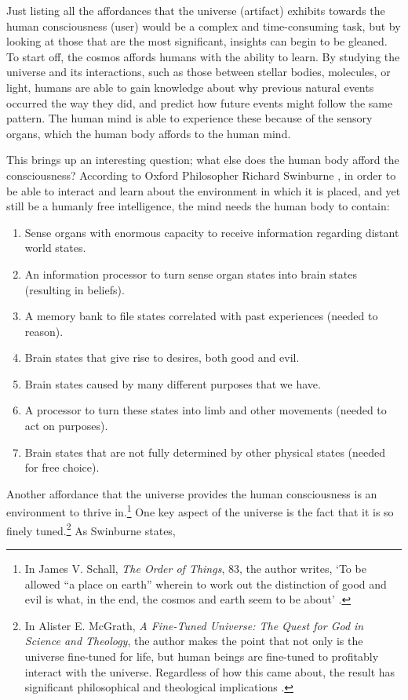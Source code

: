 Just listing all the affordances that the universe (artifact) exhibits
towards the human consciousness (user) would be a complex and
time-consuming task, but by looking at those that are the most
significant, insights can begin to be gleaned. To start off, the cosmos
affords humans with the ability to learn. By studying the universe and
its interactions, such as those between stellar bodies, molecules, or
light, humans are able to gain knowledge about why previous natural
events occurred the way they did, and predict how future events might
follow the same pattern. The human mind is able to experience these
because of the sensory organs, which the human body affords to the
human mind.

This brings up an interesting question; what else does the human body
afford the consciousness? According to Oxford Philosopher Richard
Swinburne \citep[][p.~169]{swinburne2004}, in order to be able to interact and
learn about the environment in which it is placed, and yet still be a
humanly free intelligence, the mind needs the human body to contain:

\begin{enumerate}
\item Sense organs with enormous capacity to receive information regarding
distant world states.
\item An information processor to turn sense organ states into brain states
(resulting in beliefs).
\item A memory bank to file states correlated with past experiences (needed
to reason).
\item Brain states that give rise to desires, both good and evil.
\item Brain states caused by many different purposes that we have.
\item A processor to turn these states into limb and other movements
(needed to act on purposes).
\item Brain states that are not fully determined by other physical states
(needed for free choice).
\end{enumerate}

Another affordance that the universe provides the human consciousness is
an environment to thrive in.\footnote{
In James V. Schall, \textit{The Order of Things}, 83, the author writes, ‘To be
allowed “a place on earth” wherein to work out the distinction of good
and evil is what, in the end, the cosmos and earth seem to be about’ \citep[][p.~83]{schall2007}.
} One key aspect of the
universe is the fact that it is so finely tuned.\footnote{
In Alister E. McGrath, \textit{A Fine-Tuned
Universe: The Quest for God in Science and Theology}, the author makes the point that not
only is the universe fine-tuned for life, but human beings are
fine-tuned to profitably interact with the universe. Regardless of how
this came about, the result has significant philosophical and
theological implications \citep{mcgrath2009}.
} As
Swinburne states, 

